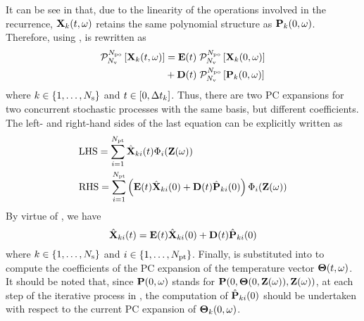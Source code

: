 It can be see in  that, due to the linearity of the operations involved in the recurrence, $\mathbf{X}_k(t, \omega)$ retains the same polynomial structure as $\mathbf{P}_k(0, \omega)$. Therefore, using ,  is rewritten as
\begin{align*}
  \oPC{\vars}{\pcorder}{\vX_k(\t, \o)} & = \mE(\t) \; \oPC{\vars}{\pcorder}{\vX_k(0, \o)} \\
  & {} + \mD(\t) \; \oPC{\vars}{\pcorder}{\vP_k(0, \o)}
\end{align*}
where $k \in \{ 1, \dotsc, N_\text{s} \}$ and $t \in [0, \Delta t_k]$. Thus, there are two PC expansions for two concurrent stochastic processes with the same basis, but different coefficients. The left- and right-hand sides of the last equation can be explicitly written as
\begin{align*}
  & \text{LHS} = \sum_{i = 1}^{\pcterms} \pcc{\vX}_{ki}(\t) \pcb_i(\vZ(\o)) \\
  & \text{RHS} = \sum_{i = 1}^{\pcterms} \left( \mE(\t) \pcc{\vX}_{ki}(0) + \mD(\t) \pcc{\vP}_{ki}(0) \right) \pcb_i(\vZ(\o))
\end{align*}
By virtue of , we have
\begin{equation} \elabel{pc-recurrence}
  \pcc{\vX}_{ki}(\t) = \mE(\t) \pcc{\vX}_{ki}(0) + \mD(\t) \pcc{\vP}_{ki}(0)
\end{equation}
where $k \in \{ 1, \dots, N_\text{s} \}$ and $i \in \{ 1, \dotsc, {N_\text{pt}} \}$. Finally,  is substituted into  to compute the coefficients of the PC expansion of the temperature vector ${\boldsymbol\Theta}(t, \omega)$. It should be noted that, since $\mathbf{P}(0, \omega)$ stands for $\mathbf{P}(0, {\boldsymbol\Theta}(0, \mathbf{Z}(\omega)), \mathbf{Z}(\omega))$, at each step of the iterative process in , the computation of $\hat{\mathbf{P}}_{ki}(0)$ should be undertaken with respect to the current PC expansion of ${\boldsymbol\Theta}_k(0, \omega)$.
